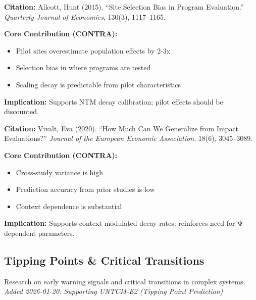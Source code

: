 \begin{tcolorbox}[colback=orange!5!white,colframe=orange!75!black,title=CONTRA Paper: Allcott (2015)]
\textbf{Citation:} Allcott, Hunt (2015). ``Site Selection Bias in Program Evaluation.'' \textit{Quarterly Journal of Economics}, 130(3), 1117--1165.

\textbf{Core Contribution (CONTRA):}
\begin{itemize}[nosep]
    \item Pilot sites overestimate population effects by 2-3x
    \item Selection bias in where programs are tested
    \item Scaling decay is predictable from pilot characteristics
\end{itemize}

\textbf{Implication:} Supports NTM decay calibration; pilot effects should be discounted.
\end{tcolorbox}

\begin{tcolorbox}[colback=orange!5!white,colframe=orange!75!black,title=CONTRA Paper: Vivalt (2020)]
\textbf{Citation:} Vivalt, Eva (2020). ``How Much Can We Generalize from Impact Evaluations?'' \textit{Journal of the European Economic Association}, 18(6), 3045--3089.

\textbf{Core Contribution (CONTRA):}
\begin{itemize}[nosep]
    \item Cross-study variance is high
    \item Prediction accuracy from prior studies is low
    \item Context dependence is substantial
\end{itemize}

\textbf{Implication:} Supports context-modulated decay rates; reinforces need for Ψ-dependent parameters.
\end{tcolorbox}

\subsection{Tipping Points \& Critical Transitions}
\label{subsec:ot-tipping}

Research on early warning signals and critical transitions in complex systems.
\textit{Added 2026-01-20: Supporting UNTCM-E2 (Tipping Point Prediction)}

